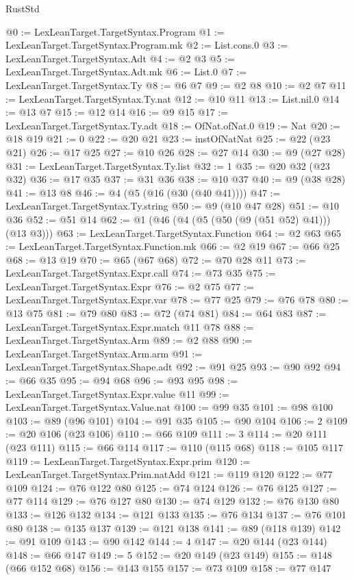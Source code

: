 \begin{lexlean}{RustStd}
\begin{coremodule}
@0 := LexLeanTarget.TargetSyntax.Program
@1 := LexLeanTarget.TargetSyntax.Program.mk
@2 := List.cons.{0}
@3 := LexLeanTarget.TargetSyntax.Adt
@4 := @2 @3
@5 := LexLeanTarget.TargetSyntax.Adt.mk
@6 := List.{0}
@7 := LexLeanTarget.TargetSyntax.Ty
@8 := @6 @7
@9 := @2 @8
@10 := @2 @7
@11 := LexLeanTarget.TargetSyntax.Ty.nat
@12 := @10 @11
@13 := List.nil.{0}
@14 := @13 @7
@15 := @12 @14
@16 := @9 @15
@17 := LexLeanTarget.TargetSyntax.Ty.adt
@18 := OfNat.ofNat.{0}
@19 := Nat
@20 := @18 @19
@21 := 0
@22 := @20 @21
@23 := instOfNatNat
@25 := @22 (@23 @21)
@26 := @17 @25
@27 := @10 @26
@28 := @27 @14
@30 := @9 (@27 @28)
@31 := LexLeanTarget.TargetSyntax.Ty.list
@32 := 1
@35 := @20 @32 (@23 @32)
@36 := @17 @35
@37 := @31 @36
@38 := @10 @37
@40 := @9 (@38 @28)
@41 := @13 @8
@46 := @4 (@5 (@16 (@30 (@40 @41))))
@47 := LexLeanTarget.TargetSyntax.Ty.string
@50 := @9 (@10 @47 @28)
@51 := @10 @36
@52 := @51 @14
@62 := @1 (@46 (@4 (@5 (@50 (@9 (@51 @52) @41))) (@13 @3)))
@63 := LexLeanTarget.TargetSyntax.Function
@64 := @2 @63
@65 := LexLeanTarget.TargetSyntax.Function.mk
@66 := @2 @19
@67 := @66 @25
@68 := @13 @19
@70 := @65 (@67 @68)
@72 := @70 @28 @11
@73 := LexLeanTarget.TargetSyntax.Expr.call
@74 := @73 @35
@75 := LexLeanTarget.TargetSyntax.Expr
@76 := @2 @75
@77 := LexLeanTarget.TargetSyntax.Expr.var
@78 := @77 @25
@79 := @76 @78
@80 := @13 @75
@81 := @79 @80
@83 := @72 (@74 @81)
@84 := @64 @83
@87 := LexLeanTarget.TargetSyntax.Expr.match @11 @78
@88 := LexLeanTarget.TargetSyntax.Arm
@89 := @2 @88
@90 := LexLeanTarget.TargetSyntax.Arm.arm
@91 := LexLeanTarget.TargetSyntax.Shape.adt
@92 := @91 @25
@93 := @90 @92
@94 := @66 @35
@95 := @94 @68
@96 := @93 @95
@98 := LexLeanTarget.TargetSyntax.Expr.value @11
@99 := LexLeanTarget.TargetSyntax.Value.nat
@100 := @99 @35
@101 := @98 @100
@103 := @89 (@96 @101)
@104 := @91 @35
@105 := @90 @104
@106 := 2
@109 := @20 @106 (@23 @106)
@110 := @66 @109
@111 := 3
@114 := @20 @111 (@23 @111)
@115 := @66 @114
@117 := @110 (@115 @68)
@118 := @105 @117
@119 := LexLeanTarget.TargetSyntax.Expr.prim
@120 := LexLeanTarget.TargetSyntax.Prim.natAdd
@121 := @119 @120
@122 := @77 @109
@124 := @76 @122 @80
@125 := @74 @124
@126 := @76 @125
@127 := @77 @114
@129 := @76 @127 @80
@130 := @74 @129
@132 := @76 @130 @80
@133 := @126 @132
@134 := @121 @133
@135 := @76 @134
@137 := @76 @101 @80
@138 := @135 @137
@139 := @121 @138
@141 := @89 (@118 @139)
@142 := @91 @109
@143 := @90 @142
@144 := 4
@147 := @20 @144 (@23 @144)
@148 := @66 @147
@149 := 5
@152 := @20 @149 (@23 @149)
@155 := @148 (@66 @152 @68)
@156 := @143 @155
@157 := @73 @109
@158 := @77 @147

\end{coremodule}
\end{lexlean}
